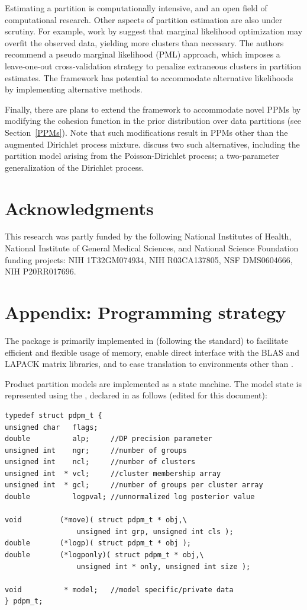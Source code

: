 \documentclass[article, nojss]{jss}
\begin{document}
Estimating a partition is computationally intensive, and an open field of computational research. Other aspects of partition estimation are also under scrutiny. For example, work by \citet{WangDunson2010} suggest that marginal likelihood optimization may overfit the observed data, yielding more clusters than necessary. The authors recommend a pseudo marginal likelihood (PML) approach, which imposes a leave-one-out cross-validation strategy to penalize extraneous clusters in partition estimates. The  framework has potential to accommodate alternative likelihoods by implementing alternative  methods.

Finally, there are plans to extend the  framework to accommodate novel PPMs by modifying the cohesion function in the prior distribution over data partitions (see Section~\ref{PPMs}). Note that such modifications result in PPMs other than the augmented Dirichlet process mixture. \citet{LauGreen2007} discuss two such alternatives, including the partition model arising from the Poisson-Dirichlet process; a two-parameter generalization of the Dirichlet process.

\section*{Acknowledgments}
This research was partly funded by the following National Institutes of Health, National Institute of General Medical Sciences, and National Science Foundation funding projects: NIH 1T32GM074934, NIH R03CA137805, NSF DMS0604666, NIH P20RR017696.

\section*{Appendix: Programming strategy}

The  package is primarily implemented in  (following the  standard) to facilitate efficient and flexible usage of memory, enable direct interface with the BLAS and LAPACK matrix libraries, and to ease translation to environments other than .

Product partition models are implemented as a state machine. The model state is represented using the  , declared in  as follows (edited for this document):
\begin{verbatim}
typedef struct pdpm_t {
unsigned char   flags;
double          alp;     //DP precision parameter
unsigned int    ngr;     //number of groups
unsigned int    ncl;     //number of clusters
unsigned int  * vcl;     //cluster membership array
unsigned int  * gcl;     //number of groups per cluster array
double          logpval; //unnormalized log posterior value

void         (*move)( struct pdpm_t * obj,\
                 unsigned int grp, unsigned int cls );
double       (*logp)( struct pdpm_t * obj );
double       (*logponly)( struct pdpm_t * obj,\
                 unsigned int * only, unsigned int size );

void          * model;   //model specific/private data
} pdpm_t;
\end{verbatim}
\end{document}
